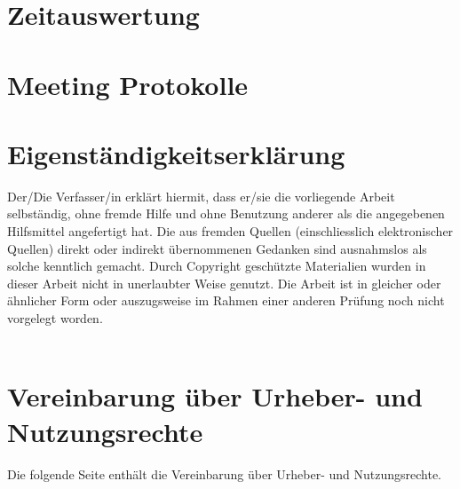 \documentclass[11pt,a4paper,english,oneside]{book}
\numberwithin{equation}{chapter}
\begin{document}
	\chapter{Zeitauswertung}
	\label{zeitauswertung}
	
	
	
	
	\chapter{Meeting Protokolle} \label{ch:minutes}
	
	\chapter{Eigenständigkeitserklärung}
	Der/Die Verfasser/in erklärt hiermit, dass er/sie die vorliegende Arbeit selbständig, ohne fremde Hilfe und ohne Benutzung anderer als die angegebenen Hilfsmittel angefertigt hat. Die aus fremden Quellen (einschliesslich elektronischer Quellen) direkt oder indirekt übernommenen Gedanken sind ausnahmslos als solche kenntlich gemacht. Durch Copyright geschützte Materialien wurden in dieser Arbeit nicht in unerlaubter Weise genutzt. Die Arbeit ist in gleicher oder ähnlicher Form oder auszugsweise im Rahmen einer anderen Prüfung noch nicht vorgelegt worden.\\[2cm]
	 \hfill {}
	\hfill \\[2cm]
	 \hfill {}
	
	\chapter{Vereinbarung über Urheber- und Nutzungsrechte}
	Die folgende Seite enthält die Vereinbarung über Urheber- und Nutzungsrechte.
		
	
	\printglossary
	\glsaddall
	
	\printbibliography[heading=bibintoc]
	
	{
		\hypersetup{linkcolor=black}
		\listoffigures
	}
	
	{
		\hypersetup{linkcolor=black}
		\listoftables
	}
	
\end{document}
